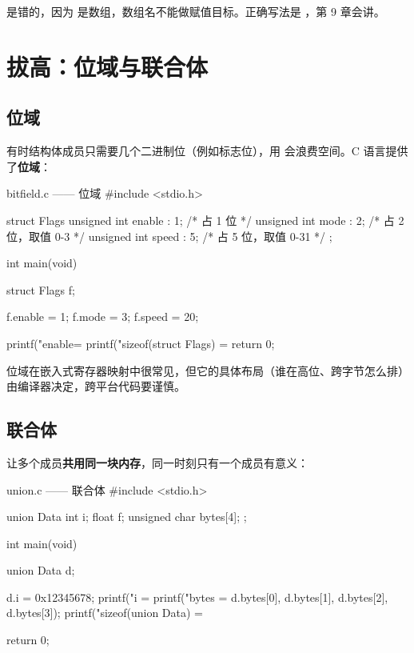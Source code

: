 \begin{pitfall}[字符串成员不能直接赋值]
 是错的，因为  是数组，数组名不能做赋值目标。正确写法是 ，第 9 章会讲。
\end{pitfall}

\section{拔高：位域与联合体}

\subsection{位域}

有时结构体成员只需要几个二进制位（例如标志位），用  会浪费空间。C 语言提供了\textbf{位域}：

\begin{codebox}{bitfield.c —— 位域}
#include <stdio.h>

struct Flags {
    unsigned int enable : 1;    /* 占 1 位 */
    unsigned int mode   : 2;    /* 占 2 位，取值 0-3 */
    unsigned int speed  : 5;    /* 占 5 位，取值 0-31 */
};

int main(void)
{
    struct Flags f;

    f.enable = 1;
    f.mode = 3;
    f.speed = 20;

    printf("enable=%
    printf("sizeof(struct Flags) = %
    return 0;
}
\end{codebox}

位域在嵌入式寄存器映射中很常见，但它的具体布局（谁在高位、跨字节怎么排）由编译器决定，跨平台代码要谨慎。

\subsection{联合体}

 让多个成员\textbf{共用同一块内存}，同一时刻只有一个成员有意义：

\begin{codebox}{union.c —— 联合体}
#include <stdio.h>

union Data {
    int i;
    float f;
    unsigned char bytes[4];
};

int main(void)
{
    union Data d;

    d.i = 0x12345678;
    printf("i = %
    printf("bytes = %
           d.bytes[0], d.bytes[1], d.bytes[2], d.bytes[3]);
    printf("sizeof(union Data) = %

    return 0;
}
\end{codebox}

